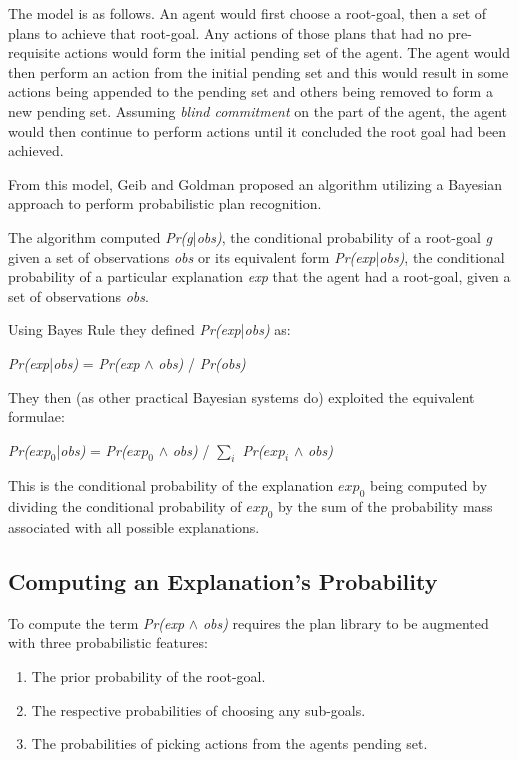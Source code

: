 \documentclass[parskip]{cs4rep}
\begin{document}
The model is as follows. An agent would first choose a root-goal, then a set of plans to achieve that root-goal. Any actions of those plans that had no pre-requisite actions would form the initial pending set of the agent. The agent would then perform an action from the initial pending set and this would result in some actions being appended to the pending set and others being removed to form a new pending set. Assuming \textit{blind commitment} on the part of the agent, the agent would then continue to perform actions until it concluded the root goal had been achieved.

From this model, Geib and Goldman proposed an algorithm utilizing a Bayesian approach to perform probabilistic plan recognition. 

The algorithm computed \textit{Pr(g}|\textit{obs)}, the conditional probability of a root-goal \textit{g} given a set of observations \textit{obs} or its equivalent form \textit{Pr(exp}|\textit{obs)}, the conditional probability of a particular explanation \textit{exp} that the agent had a root-goal, given a set of observations \textit{obs}.

Using Bayes Rule they defined \textit{Pr(exp}|\textit{obs)} as:\newline

\centerline{
\textit{Pr(exp}|\textit{obs)} = \textit{Pr(exp} $\wedge$ \textit{obs)} / \textit{Pr(obs)}
}

They then (as other practical Bayesian systems do) exploited the equivalent formulae:\newline

\centerline{
\textit{Pr($exp_0$}|\textit{obs)} = \textit{Pr($exp_0$} $\wedge$ \textit{obs)} / $\displaystyle\sum\nolimits_{i}$ \textit{Pr($exp_i$} $\wedge$ \textit{obs)}
}

This is the conditional probability of the explanation $exp_0$ being computed by dividing the conditional probability of $exp_0$  by the sum of the probability mass associated with all possible explanations.

\subsection{Computing an Explanation's Probability}

To compute the term \textit{Pr(exp} $\wedge$ \textit{obs)} requires the plan library to be augmented with three probabilistic features:\newline

\begin{enumerate}
\item
The prior probability of the root-goal.
\item
The respective probabilities of choosing any sub-goals.
\item
The probabilities of picking actions from the agents pending set.
\end{enumerate}
\end{document}
